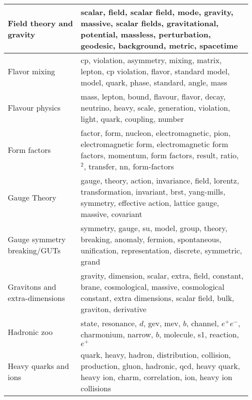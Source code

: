 \begin{longtable}[H]{p{}|p{}}
Field theory and gravity                              &                                              scalar, field, scalar field, mode, gravity, massive, scalar fields, gravitational, potential, massless, perturbation, geodesic, background, metric, spacetime \\ \midrule
Flavor mixing                                         &                                                                         cp, violation, asymmetry, mixing, matrix, lepton, cp violation, flavor, standard model, model, quark, phase, standard, angle, mass \\ \midrule
Flavour physics                                       &                                                                                 mass, lepton, bound, flavour, flavor, decay, neutrino, heavy, scale, generation, violation, light, quark, coupling, number \\ \midrule
Form factors                                          &                                  factor, form, nucleon, electromagnetic, pion, electromagnetic form, electromagnetic form factors, momentum, form factors, result, ratio, $^2$, transfer, nn, form-factors \\ \midrule
Gauge Theory                                          &                                              gauge, theory, action, invariance, field, lorentz, transformation, invariant, brst, yang-mills, symmetry, effective action, lattice gauge, massive, covariant \\ \midrule
Gauge symmetry breaking/GUTs                          &                                                                symmetry, gauge, su, model, group, theory, breaking, anomaly, fermion, spontaneous, unification, representation, discrete, symmetric, grand \\ \midrule
Gravitons and extra-dimensions                        &                                        gravity, dimension, scalar, extra, field, constant, brane, cosmological, massive, cosmological constant, extra dimensions, scalar field, bulk, graviton, derivative \\ \midrule
Hadronic zoo                                          &                                                                                            state, resonance, $d$, gev, mev, $b$, channel, $e^+e^-$, charmonium, narrow, $b$, molecule, s1, reaction, $e^+$ \\ \midrule
Heavy quarks and ions                                 &                                                     quark, heavy, hadron, distribution, collision, production, gluon, hadronic, qcd, heavy quark, heavy ion, charm, correlation, ion, heavy ion collisions \\ \midrule

\end{longtable}
